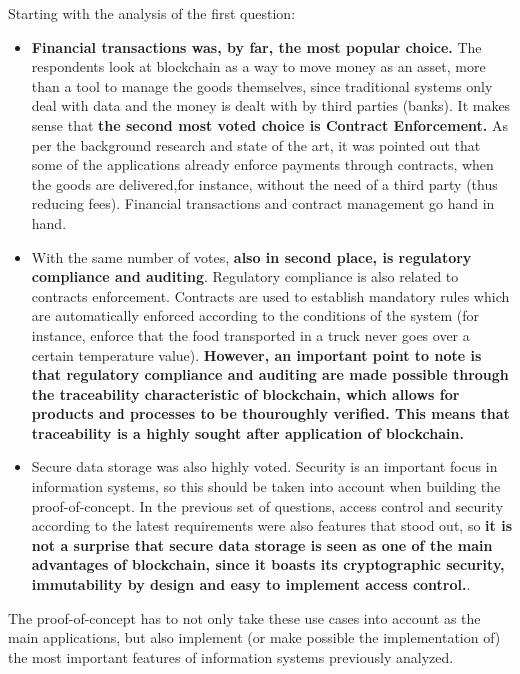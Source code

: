 Starting with the analysis of the first question:
\begin{itemize}
    \item \textbf{Financial transactions was, by far, the most popular choice.} The respondents look at blockchain as a way to move money as an asset, more than a tool to manage the goods themselves, since traditional systems only deal with data and the money is dealt with by third parties (banks). It makes sense that \textbf{the second most voted choice is Contract Enforcement.} As per the background research and state of the art, it was pointed out that some of the applications already enforce payments through contracts, when the goods are delivered,for instance, without the need of a third party (thus reducing fees). Financial transactions and contract management go hand in hand. 
     
    \item With the same number of votes, \textbf{also in second place, is regulatory compliance and auditing}. Regulatory compliance is also related to contracts enforcement. Contracts are used to establish mandatory rules which are automatically enforced according to the conditions of the system (for instance, enforce that the food transported in a truck never goes over a certain temperature value). \textbf{However, an important point to note is that regulatory compliance and auditing are made possible through the traceability characteristic of blockchain, which allows for products and processes to be thouroughly verified. This means that traceability is a highly sought after application of blockchain.}
    \item Secure data storage was also highly voted. Security is an important focus in information systems, so this should be taken into account when building the proof-of-concept. In the previous set of questions, access control and security according to the latest requirements were also features that stood out, so \textbf{it is not a surprise that secure data storage is seen as one of the main advantages of blockchain, since it boasts its cryptographic security, immutability by design and easy to implement access control.}. 
\end{itemize}

The proof-of-concept has to not only take these use cases into account as the main applications, but also implement (or make possible the implementation of) the most important features of information systems previously analyzed.

